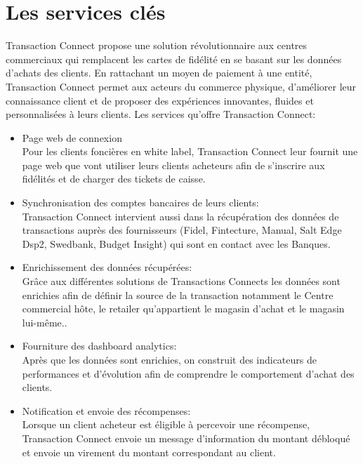\section{Les services clés}
 Transaction Connect propose une solution révolutionnaire aux centres commerciaux qui remplacent les cartes de fidélité en se basant sur les données d’achats des clients. 
En rattachant un moyen de paiement à une entité,  Transaction Connect permet aux acteurs du commerce physique, d’améliorer leur connaissance client et de proposer des expériences innovantes, fluides et personnalisées à leurs clients. Les services qu’offre Transaction Connect:
\begin{itemize}
\item Page web de connexion\\
Pour les clients foncières en white label, Transaction Connect leur fournit une page web que vont utiliser leurs clients acheteurs afin de s’inscrire aux fidélités et de charger des tickets de caisse.
\item Synchronisation des comptes bancaires de leurs clients:\\
Transaction Connect intervient aussi dans la récupération des données de transactions auprès des fournisseurs (Fidel, Fintecture, Manual, Salt Edge Dsp2, Swedbank, Budget Insight) qui sont en contact avec les Banques. 
\item Enrichissement des données récupérées:\\
Grâce aux différentes solutions de Transactions Connects les données sont enrichies afin de définir la source de la transaction notamment le Centre commercial hôte, le retailer qu’appartient le magasin d’achat et le magasin lui-même..
\item Fourniture des dashboard analytics:\\
Après que les données sont enrichies, on construit des indicateurs de performances et d’évolution afin de comprendre le comportement d’achat des clients.
\item Notification et envoie des récompenses:\\
Lorsque un client acheteur est éligible à percevoir une récompense, Transaction Connect envoie un message d’information du montant débloqué et envoie un virement du montant correspondant au client.
\end{itemize}
\newpage

